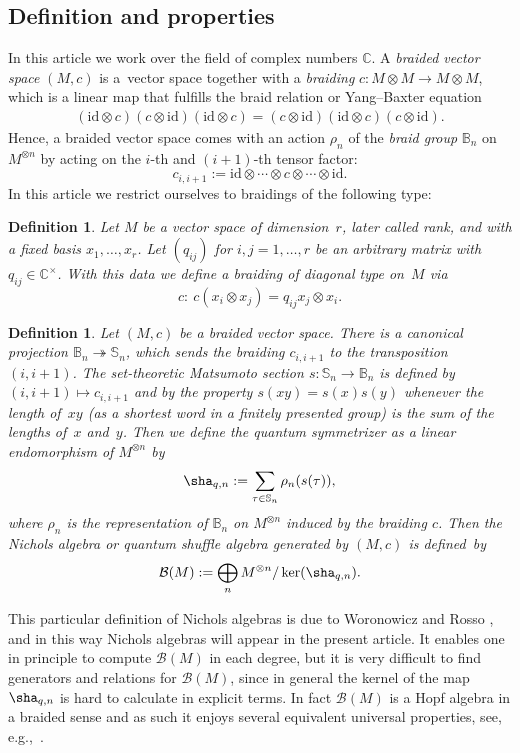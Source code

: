 \documentclass[10pt,a4paper]{amsart}
\numberwithin{equation}{section}
\newtheorem{defin}[teo]{Definition}
\newcommand{\C}{\mathbb{C}}
\newcommand{\cB}{\mathcal{B}}
\begin{document}
\subsection{Definition and properties}
In this article we work over the field of complex numbers $\C$. A \emph{braided vector space} $(M,c)$ is a~vector space together with a \emph{braiding} $c\colon M\otimes M\to M\otimes M$, which is a linear map that fulfills the braid relation or Yang--Baxter equation
\begin{gather*}
(\mathrm{id}\otimes c)(c\otimes \mathrm{id})(\mathrm{id}\otimes c)
=(c\otimes \mathrm{id})(\mathrm{id}\otimes c)(c\otimes \mathrm{id}).\end{gather*}
Hence, a braided vector space comes with an action $\rho_n$ of the \emph{braid group} $\mathbb{B}_n$ on $M^{\otimes n}$ by acting on the $i$-th and $(i+1)$-th tensor factor:
\[c_{i,i+1}:=\mathrm{id}\otimes \cdots \otimes c \otimes \cdots \otimes \mathrm{id}.\]
In this article we restrict ourselves to braidings of the following type:
\begin{defin}
	Let $M$ be a vector space of dimension~$r$, later called \emph{rank}, and with a fixed basis $x_1,\dots, x_r$. Let $(q_{ij})$ for ${i,j=1,\dots, r}$ be an arbitrary matrix with $q_{ij}\in \C^\times$. With this data we define a \emph{braiding of diagonal type} on~$M$ via
	\[c\colon \ c(x_i\otimes x_j)=q_{ij} x_j\otimes x_i.\]
\end{defin}
\begin{defin}\label{def_QuantumSymmetrizer}
 Let $(M, c)$ be a braided vector space. There is a canonical projection $\mathbb{B}_n\twoheadrightarrow \mathbb{S}_n$, which sends the braiding $c_{i,i+1}$ to the transposition~{$(i,i+1)$}. The set-theoretic \emph{Matsumoto section} $s\colon \mathbb{S}_n \rightarrow \mathbb{B}_n$ is defined by $(i,i+1)\mapsto c_{i,i + 1}$ and by the property $s(xy) = s(x)s(y)$ whenever the length of~$xy$ (as a shortest word in a finitely presented group) is the sum of the lengths of~$x$ and~$y$. Then we define the \emph{quantum symmetrizer} as a linear endomorphism of $M^{\otimes n}$ by
\begin{equation*}%
 \sha_{q,n}: =\sum_{\tau\in \mathbb{S}_n} \rho_n(s(\tau)),
\end{equation*}
where $\rho_n$ is the representation of $\mathbb{B}_n$ on $M^{\otimes n}$ induced by the braiding $c$.
Then the \emph{Nichols algebra} or \emph{quantum shuffle algebra} generated by $(M,c)$ is defined~by
\[\cB(M) :=\bigoplus _{n} M^{\otimes n}/ \operatorname{ker} (\sha_{q,n}).\]
\end{defin}
This particular definition of Nichols algebras is due to Woronowicz \cite{Wor89} and Rosso \cite{Rosso98}, and in this way Nichols algebras will appear in the present article. It enables one in principle to compute $\mathcal{B}(M)$ in each degree, but it is very difficult to find generators and relations for $\mathcal{B}(M)$, since in general the kernel of the map $\sha_{q,n}$ is hard to calculate in explicit terms.
In fact $\cB(M)$ is a Hopf algebra in a braided sense and as such it enjoys several equivalent universal properties, see, e.g.,~\cite[Chapters 1 and~7]{HS20}.
\end{document}
